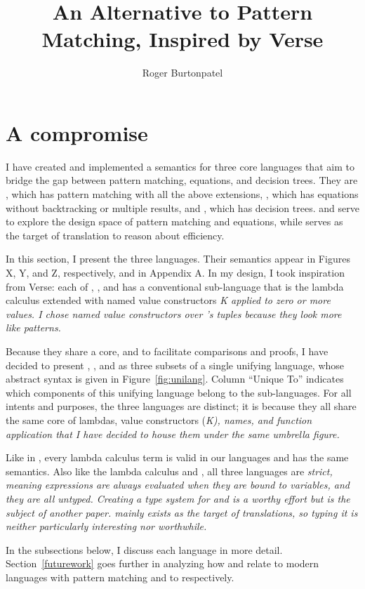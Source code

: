 \documentclass[manuscript,screen,review, 12pt, nonacm]{acmart}
\title{An Alternative to Pattern Matching, Inspired by Verse}
\author{Roger Burtonpatel}
\affiliation{%
\institution{Tufts University}
\streetaddress{419 Boston Ave}
  \city{Medford}
  \state{Massachusetts}
  \country{USA}
  \postcode{02155}
  }
\begin{document}
  
\section{A compromise}
    I have created and implemented a semantics for three core languages that aim
    to bridge the gap between pattern matching, equations, and decision trees.
    They are \PPlus, which has pattern matching with all the above extensions,
    \VMinus, which has equations without backtracking or multiple results, and
    \D, which has decision trees. \PPlus and \VMinus serve to explore the
    design space of pattern matching and equations, while \D serves as the
    target of translation to reason about efficiency. 

    In this section, I present the three languages. Their semantics appear in
    Figures X, Y, and Z, respectively, and in Appendix A. In my design, I took
    inspiration from Verse: each of \PPlus, \VMinus, and \D has a conventional
    sub-language that is the lambda calculus extended with named value
    constructors \it{K} applied to zero or more values. I chose named value
    constructors over \VC's tuples because they look more like patterns. 
    
    Because they share a core, and to facilitate comparisons and proofs, I have
    decided to present \VMinus, \PPlus, and \D as three subsets of a single
    unifying language, whose abstract syntax is given in
    Figure~\ref{fig:unilang}. Column “Unique To” indicates which components of
    this unifying language belong to the sub-languages. For all intents and
    purposes, the three languages are distinct; it is because they all share the
    same core of lambdas, value constructors (\it{K}), names, and function
    application that I have decided to house them under the same umbrella
    figure. 
    
    Like in \VC, every lambda calculus term is valid in our languages and has
    the same semantics. Also like the lambda calculus and \VC, all three
    languages are \it{strict}, meaning expressions are always evaluated when
    they are bound to variables, and they are all untyped. Creating a type
    system for \PPlus and \VMinus is a worthy effort but is the subject of
    another paper. \D mainly exists as the target of translations, so typing it
    is neither particularly interesting nor worthwhile. 
    
    In the subsections below, I discuss each language in more detail.
    Section~\ref{futurework} goes further in analyzing how \PPlus and \VMinus
    relate to modern languages with pattern matching and to \VC respectively. 
\end{document}
